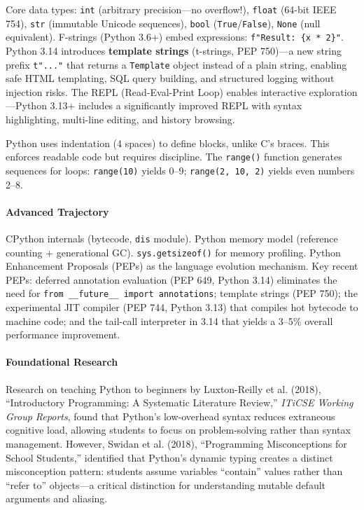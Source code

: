 \documentclass[11pt, a4paper, oneside]{report}
\begin{document}
Core data types: \texttt{int} (arbitrary precision---no overflow!), \texttt{float} (64-bit IEEE 754), \texttt{str} (immutable Unicode sequences), \texttt{bool} (\texttt{True}/\texttt{False}), \texttt{None} (null equivalent). F-strings (Python 3.6+) embed expressions: \texttt{f"Result: \{x * 2\}"}. Python 3.14 introduces \textbf{template strings} (t-strings, PEP 750)---a new string prefix \texttt{t"..."} that returns a \texttt{Template} object instead of a plain string, enabling safe HTML templating, SQL query building, and structured logging without injection risks. The REPL (Read-Eval-Print Loop) enables interactive exploration---Python 3.13+ includes a significantly improved REPL with syntax highlighting, multi-line editing, and history browsing.

Python uses indentation (4 spaces) to define blocks, unlike C's braces. This enforces readable code but requires discipline. The \texttt{range()} function generates sequences for loops: \texttt{range(10)} yields 0--9; \texttt{range(2, 10, 2)} yields even numbers 2--8.

\paragraph{Advanced Trajectory} CPython internals (bytecode, \texttt{dis} module). Python memory model (reference counting + generational GC). \texttt{sys.getsizeof()} for memory profiling. Python Enhancement Proposals (PEPs) as the language evolution mechanism. Key recent PEPs: deferred annotation evaluation (PEP 649, Python 3.14) eliminates the need for \texttt{from \_\_future\_\_ import annotations}; template strings (PEP 750); the experimental JIT compiler (PEP 744, Python 3.13) that compiles hot bytecode to machine code; and the tail-call interpreter in 3.14 that yields a 3--5\% overall performance improvement.


\paragraph{Foundational Research} Research on teaching Python to beginners by Luxton-Reilly et al. (2018), ``Introductory Programming: A Systematic Literature Review,'' \emph{ITiCSE Working Group Reports}, found that Python's low-overhead syntax reduces extraneous cognitive load, allowing students to focus on problem-solving rather than syntax management. However, Swidan et al. (2018), ``Programming Misconceptions for School Students,'' identified that Python's dynamic typing creates a distinct misconception pattern: students assume variables ``contain'' values rather than ``refer to'' objects---a critical distinction for understanding mutable default arguments and aliasing.
\end{document}
